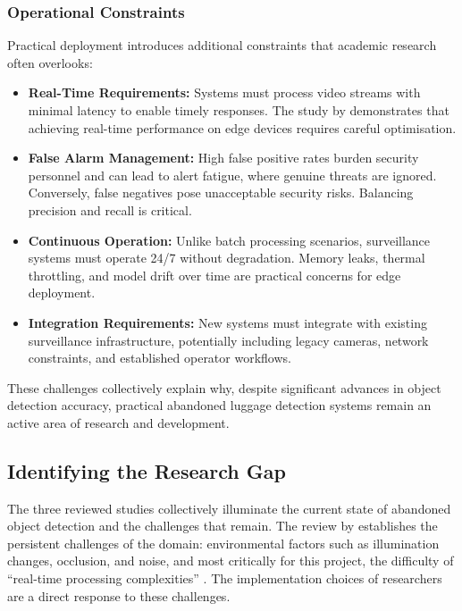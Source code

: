 \subsubsection{Operational Constraints}

Practical deployment introduces additional constraints that academic research
often overlooks:

\begin{itemize}
	\item \textbf{Real-Time Requirements:} Systems must process video streams
	      with minimal latency to enable timely responses. The study by
	      \citet{zhu2022performance} demonstrates that achieving real-time
	      performance on edge devices requires careful optimisation.
	\item \textbf{False Alarm Management:} High false positive rates burden
	      security personnel and can lead to alert fatigue, where genuine threats
	      are ignored. Conversely, false negatives pose unacceptable security
	      risks. Balancing precision and recall is critical.
	\item \textbf{Continuous Operation:} Unlike batch processing scenarios,
	      surveillance systems must operate 24/7 without degradation. Memory
	      leaks, thermal throttling, and model drift over time are practical
	      concerns for edge deployment.
	\item \textbf{Integration Requirements:} New systems must integrate with
	      existing surveillance infrastructure, potentially including legacy
	      cameras, network constraints, and established operator workflows.
\end{itemize}

These challenges collectively explain why, despite significant advances in
object detection accuracy, practical abandoned luggage detection systems remain
an active area of research and development.

\subsection{Identifying the Research Gap}

The three reviewed studies collectively illuminate the current state of
abandoned object detection and the challenges that remain. The review by
\citeauthor{dubey2024critical} establishes the persistent challenges of the
domain: environmental factors such as illumination changes, occlusion, and
noise, and most critically for this project, the difficulty of
\enquote{real-time processing complexities} \citep{dubey2024critical}. The
implementation choices of researchers are a direct response to these
challenges.

